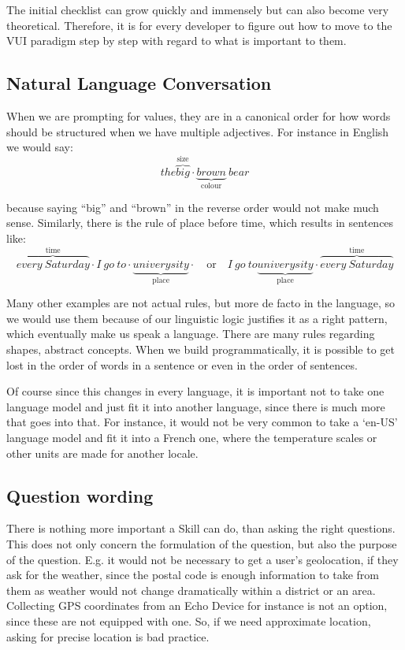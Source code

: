 The initial checklist can grow quickly and immensely but can also become very theoretical. Therefore, it is for every developer to figure out how to move to the VUI paradigm step by step with regard to what is important to them.



\subsection*{Natural Language Conversation}
When we are prompting for values, they are in a canonical order for how words should be structured when we have multiple adjectives. For instance in English we would say:
\[
	the 
\overbrace{big}^\text{size} \cdot
\underbrace{brown}_\text{colour}
\ bear 
\]

\noindent because saying ``big'' and ``brown'' in the reverse order would not make much sense. Similarly, there is the rule of place before time, which results in sentences like: 
	\[
	\overbrace{every \ Saturday}^\text{time} \cdot
		I \ go \ to  \cdot
	\underbrace{univerysity}_\text{place} \cdot
	\quad \textrm{or} \quad
	I \ go \ to 
	\underbrace{univerysity}_\text{place} \cdot
	\overbrace{every \ Saturday}^\text{time}
	\]

Many other examples are not actual rules, but more de facto	in the language, so we would use them because of our linguistic logic justifies it as a right pattern, which eventually make us speak a language. There are many rules regarding shapes, abstract concepts. When we build programmatically, it is possible to get lost in the order of words in a sentence or even in the order of sentences.

Of course since this changes in every language, it is important not to take one language model and just fit it into another language, since there is much more that goes into that. For instance, it would not be very common to take a `en-US' language model and fit it into a French one, where the temperature scales or other units are made for another locale.


\subsection*{Question wording}
There is nothing more important a Skill can do, than asking the right questions. This does not only concern the formulation of the question, but also the purpose of the question. E.g. it would not be necessary to get a user's geolocation, if they ask for the weather, since the postal code is enough information to take from them as weather would not change dramatically within a district or an area. Collecting GPS coordinates from an Echo Device for instance is not an option, since these are not equipped with one. So, if we need approximate location, asking for precise location is bad practice.


